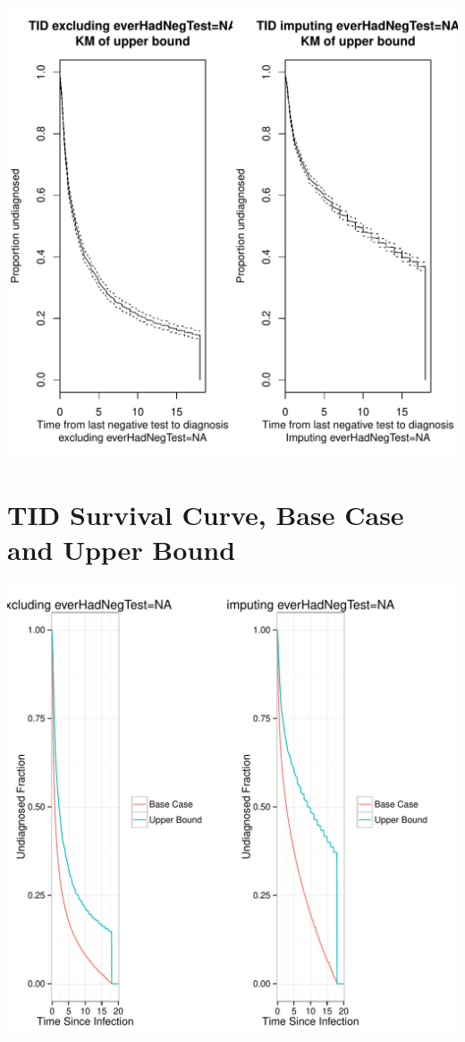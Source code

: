 \documentclass{article}\usepackage[]{graphicx}\usepackage[]{color}
\makeatletter
\def\maxwidth{ %
  \ifdim\Gin@nat@width>\linewidth
    \linewidth
  \else
    \Gin@nat@width
  \fi
}
\newenvironment{knitrout}{}{} %
\makeatother
\begin{document}
\begin{knitrout}\footnotesize
{}\color{fgcolor}

{\centering \includegraphics[width=\maxwidth]{figure/minimal-kmplot} 

}



\end{knitrout}


\section{TID Survival Curve, Base Case and Upper Bound}

\begin{knitrout}\footnotesize
{}\color{fgcolor}

{\centering \includegraphics[width=\maxwidth]{figure/minimal-smoothsurv} 

}



\end{knitrout}
\end{document}
